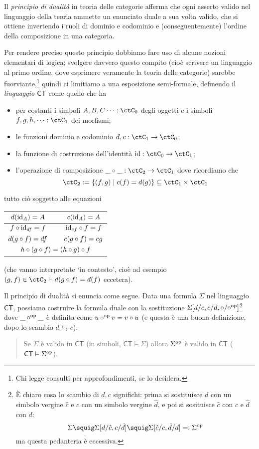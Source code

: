 \begin{proposition}
	Il \emph{principio di dualità} in teoria delle categorie afferma che ogni asserto valido nel linguaggio della teoria ammette un enunciato duale a sua volta valido, che si ottiene invertendo i ruoli di dominio e codominio e (conseguentemente) l'ordine della composizione in una categoria.

	Per rendere preciso questo principio dobbiamo fare uso di alcune nozioni elementari di logica; svolgere davvero questo compito (cioè scrivere un linguaggio al primo ordine, dove esprimere veramente la teoria delle categorie) sarebbe fuorviante,\footnote{Chi legge consulti \cite{ETCC} per approfondimenti, se lo desidera.} quindi ci limitiamo a una esposizione semi-formale, definendo il \emph{linguaggio \(\mathsf{CT}\)} come quello che ha
	\begin{itemize}
		\item per costanti i simboli \(A,B,C\dots : \ctC_0\) degli oggetti e i simboli \(f,g,h,\dots : \ctC_1\) dei morfismi;
		\item le funzioni dominio e codominio \(d,c : \ctC_1\to\ctC_0\);
		\item la funzione di costruzione dell'identità \(\id : \ctC_0\to \ctC_1\);
		\item l'operazione di composizione \(\_\cmp\_ : \ctC_2 \to \ctC_1\) dove ricordiamo che
		      \[\ctC_2 := \{(f,g)\mid c(f) = d(g)\}\subseteq\ctC_1\times\ctC_1\]
	\end{itemize}
	tutto ciò soggetto alle equazioni
	\begin{center}
		\begin{tabular}{ccc}
			\(d(\mathrm{id}_A)=A\)       &  & \(c(\mathrm{id}_A)=A\)       \\\midrule
			\(f\circ \mathrm{id}_{df}=f\) &  & \(\mathrm{id}_{cf}\circ f=f\) \\\midrule
			\(d(g\circ f)=df\)    &  & \(c(g\circ f)=cg\)    \\\midrule
			\multicolumn{3}{c}{\(h\circ (g\circ f)=(h\circ g)\circ f\)}
		\end{tabular}
	\end{center}
	(che vanno interpretate `in contesto', cioè ad esempio \((g,f) \in \ctC_2\vdash d(g\cmp f)=d(f)\) eccetera).

	Il principio di dualità si enuncia come segue.
	Data una formula \(\Sigma\) nel linguaggio \(\mathsf{CT}\), possiamo costruire la formula duale con la sostituzione \(\Sigma[d/c,c/d,\circ/\circ^{\text{op}}]\)\footnote{\`E chiaro cosa lo scambio di \(d,c\) significhi: prima si sostituisce \(d\) con un simbolo vergine \(\hat c\) e \(c\) con un simbolo vergine \(\hat d\), e poi si sosituisce \(\hat c\) con \(c\) e \(\hat d\) con \(d\):
		\[\Sigma \squig \Sigma[d/\hat c,c/\hat d]\squig \Sigma[\hat c/c,\hat d/d] =:\Sigma^\op\]
		ma questa pedanteria è eccessiva.} dove \(\_\circ^{\text{op}}\_\) è definita come \(u\circ^{\text{op}} v = v\circ u\) (e questa è una buona definizione, dopo lo scambio \(d\leftrightarrows c\)).
	\begin{quote}%
		Se \(\Sigma\) è valido in \(\mathsf{CT}\) (in simboli, \(\mathsf{CT}\vDash \Sigma\)) allora \(\Sigma^{\text{op}}\) è valido in \(\mathsf{CT}\) (\(\mathsf{CT}\vDash \Sigma^{\text{op}}\)).
	\end{quote}
\end{proposition}
